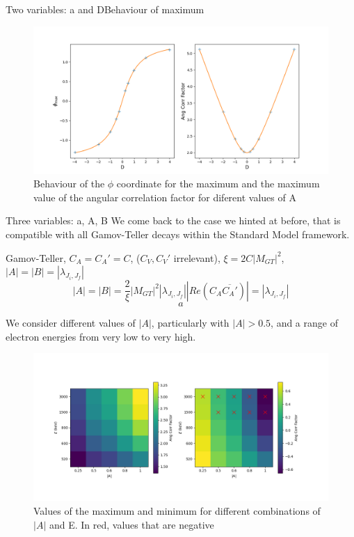 \documentclass{beamer}
\begin{document}
\begin{frame}{Two variables: a and D}{Behaviour of maximum}
	\begin{figure}
		\centering
		\includegraphics[width=0.8\paperwidth]{plots/aD_max_behaviour}
		\caption{Behaviour of the $\phi$ coordinate for the maximum and the maximum value of the angular correlation factor for diferent values of A}
	\end{figure}
\end{frame}

\begin{frame}{Three variables: a, A, B}
	We come back to the case we hinted at before, that is compatible with all Gamov-Teller decays within the Standard Model framework.
	
	Gamov-Teller, $C_A = C_A' = C$, ($C_V, C_V'$ irrelevant), $\xi=2C|M_{GT}|^2$, $|A| = |B| = |\lambda_{J_i,J_f}|$ 
	$$|A| = |B| = \frac{2}{\xi}|M_{GT}|^2|\lambda_{J_i,J_f}||Re(C_A\overline{C_A'})| = |\lambda_{J_i,J_f}|$$
	$$a$$
	
	We consider different values of $|A|$, particularly with $|A| > 0.5$, and a range of electron energies from very low to very high.
	
\end{frame}
\begin{frame}
	\begin{figure}
	\centering
	\includegraphics[width=0.8\paperwidth]{plots/aAB_gt_current_physics}
	\caption{Values of the maximum and minimum for different combinations of $|A|$ and E. In red, values that are negative}
	\end{figure}
\end{frame}
\end{document}
